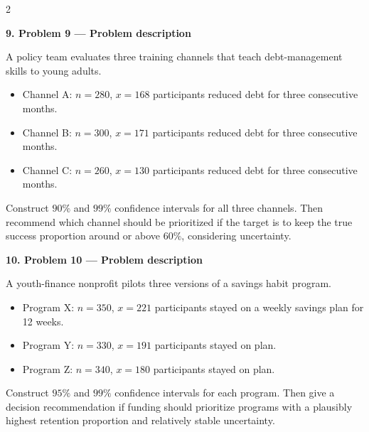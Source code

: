 \documentclass[12pt]{article}
\newcommand{\SubsectionBox}[1]{%
\noindent\colorbox{gray!30}{\parbox{\linewidth}{\textbf{#1}}}\par\vspace{0.35cm}%
}
\begin{document}
\begin{multicols}{2}
\vspace{0.25cm}
\SubsectionBox{9. Problem 9 --- Problem description}\vspace{-0.25cm}
A policy team evaluates three training channels that teach debt-management skills to young adults.
\begin{itemize}
  \item Channel A: \(n=280\), \(x=168\) participants reduced debt for three consecutive months.
  \item Channel B: \(n=300\), \(x=171\) participants reduced debt for three consecutive months.
  \item Channel C: \(n=260\), \(x=130\) participants reduced debt for three consecutive months.
\end{itemize}
Construct \(90\%\) and \(99\%\) confidence intervals for all three channels. Then recommend which channel should be prioritized if the target is to keep the true success proportion around or above \(60\%\), considering uncertainty.

\vspace{0.25cm}
\SubsectionBox{10. Problem 10 --- Problem description}\vspace{-0.25cm}
A youth-finance nonprofit pilots three versions of a savings habit program.
\begin{itemize}
  \item Program X: \(n=350\), \(x=221\) participants stayed on a weekly savings plan for 12 weeks.
  \item Program Y: \(n=330\), \(x=191\) participants stayed on plan.
  \item Program Z: \(n=340\), \(x=180\) participants stayed on plan.
\end{itemize}
Construct \(95\%\) and \(99\%\) confidence intervals for each program. Then give a decision recommendation if funding should prioritize programs with a plausibly highest retention proportion and relatively stable uncertainty.

\end{multicols}
\end{document}
